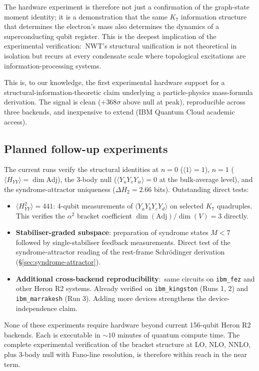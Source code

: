\documentclass[11pt]{article}
\newcommand{\Adj}{\mathrm{Adj}}
\begin{document}
The hardware experiment is therefore not just a confirmation of
the graph-state moment identity; it is a demonstration that the
same $K_7$ information structure that determines the electron's mass
also determines the dynamics of a superconducting qubit register.
This is the deepest implication of the experimental verification:\
NWT's structural unification is not theoretical in isolation but
recurs at every condensate scale where topological excitations are
information-processing systems.

This is, to our knowledge, the first experimental hardware support
for a structural-information-theoretic claim underlying a
particle-physics mass-formula derivation.  The signal is clean
($+368\sigma$ above null at peak), reproducible across three
backends, and inexpensive to extend (IBM Quantum Cloud academic
access).

\subsection{Planned follow-up experiments}
\label{sec:heron-followup}

The current runs verify the structural identities at $n=0$
($\langle 1\rangle = 1$), $n=1$ ($\langle H_{YY}\rangle = \dim\Adj$),
the 3-body null ($\langle Y_uY_vY_w\rangle = 0$ at the bulk-average
level), and the syndrome-attractor uniqueness
($\Delta H_2 = 2.66$ bits).  Outstanding direct tests:

\begin{itemize}
\item \textbf{$\langle H_{YY}^2\rangle = 441$}:  4-qubit measurements
  of $\langle Y_a Y_b Y_c Y_d\rangle$ on selected $K_7$ quadruples.
  This verifies the $\alpha^2$ bracket coefficient
  $\dim(\Adj)/\dim(V) = 3$ directly.
\item \textbf{Stabiliser-graded subspace}:  preparation of
  syndrome states $M < 7$ followed by single-stabiliser feedback
  measurements.  Direct test of the syndrome-attractor reading
  of the rest-frame Schr\"odinger derivation
  (\S\ref{sec:syndrome-attractor}).
\item \textbf{Additional cross-backend reproducibility}:\ same
  circuits on \texttt{ibm\_fez} and other Heron R2 systems.
  Already verified on \texttt{ibm\_kingston} (Runs 1, 2) and
  \texttt{ibm\_marrakesh} (Run 3).  Adding more devices
  strengthens the device-independence claim.
\end{itemize}

\noindent
None of these experiments require hardware beyond current 156-qubit
Heron R2 backends.  Each is executable in $\sim 10$ minutes of
quantum compute time.  The complete experimental verification of
the bracket structure at LO, NLO, NNLO, plus 3-body null with
Fano-line resolution, is therefore within reach in the near term.
\end{document}

